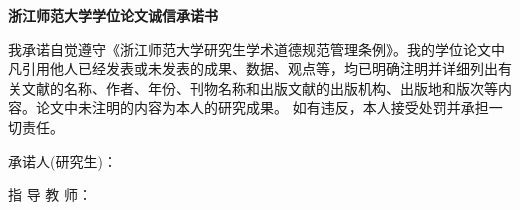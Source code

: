 \documentclass[12pt,]{report}
\begin{document}
\clearpage\pagestyle{empty}\mbox{}\clearpage
\vspace{1.5cm}


\begin{center}
\Large \textbf{浙江师范大学学位论文诚信承诺书}
\end{center}\vspace{0.54cm}

\pagestyle{plain}

\vspace{1.5cm}


我承诺自觉遵守《浙江师范大学研究生学术道德规范管理条例》。我的学位论文中凡引用他人已经发表或未发表的成果、数据、观点等，均已明确注明并详细列出有关文献的名称、作者、年份、刊物名称和出版文献的出版机构、出版地和版次等内容。论文中未注明的内容为本人的研究成果。
如有违反，本人接受处罚并承担一切责任。

\vspace{2.5cm}
\setlength\parindent{15em}

                          承诺人(研究生)：
                          
\vspace{1.0cm}                       
                          
                          指   导  教  师：


\vspace{1.5cm}
\clearpage
\end{document}
